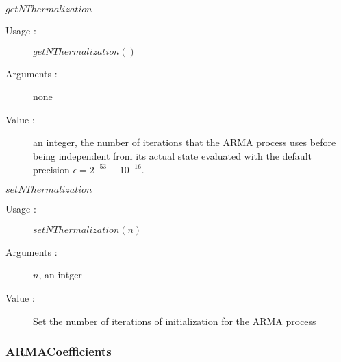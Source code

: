 \begin{description}
\begin{description}
\begin{description}
    \end{description}
    \bigskip

  \item $getNThermalization$
    \begin{description}
    \item[Usage :] $getNThermalization()$
    \item[Arguments :] none
    \item[Value :] an integer, the number of iterations that the ARMA process uses before being independent from its actual state evaluated with the default precision  $\epsilon = 2^{-53} \equiv 10^{-16}$.
    \end{description}
    \bigskip

  \item $setNThermalization$
    \begin{description}
    \item[Usage :] $setNThermalization(n)$
    \item[Arguments :] $n$, an intger
    \item[Value :] Set the number of iterations of initialization for the ARMA process
    \end{description}
    \bigskip

  \end{description}

\end{description}


\newpage \subsubsection{ARMACoefficients}


